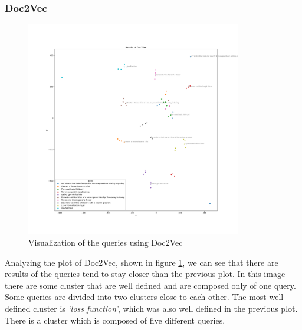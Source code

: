 \documentclass [14 pt]{article}
\begin{document}
\subsubsection{Doc2Vec}
\begin{figure}[H]
\centering
\includegraphics[width=0.84\textwidth]{../res/doc2vec.png}
\caption{Visualization of the queries using Doc2Vec}\label{fig:doc2vec}
\end{figure}
Analyzing the plot of Doc2Vec, shown in figure \ref{fig:doc2vec}, we can see that there are  results of the queries tend to stay closer than the previous plot.
In this image there are some cluster that are well defined and are composed only of one query. Some queries are divided into two clusters close to each other.
The most well defined cluster is \emph{`loss function'}, which was also well defined in the previous plot. 
There is a cluster which is composed of five different queries.


\end{document}
